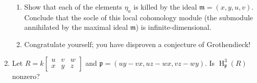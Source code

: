 \documentclass[11pt]{book}
\numberwithin{equation}{section}
\numberwithin{theorem}{chapter}
\theoremstyle{definition}
\newtheorem*{basic properties}{Basic Properties}
\newtheorem*{Important Remark}{Important Remark}
\theoremstyle{remark}
\newcommand{\m}{\mathfrak{m}}
\newcommand{\p}{\mathfrak{p}}
\renewcommand{\H}{\operatorname{H}}
\begin{document}
\begin{enumerate}[1)]
\begin{enumerate}
		
		\item Show that each of the elements $\eta_a$ is killed by the ideal $\m=(x,y,u,v)$. Conclude that the socle of this local cohomology module (the submodule annihilated by the maximal ideal $\m$) is infinite-dimensional.

		
		\item Congratulate yourself; you have disproven a conjecture of Grothendieck!
		
	\end{enumerate}
	

	
	\item Let $R = \displaystyle k\begin{bmatrix} u & v & w \\ x & y & z\end{bmatrix}$ and $\p=(uy-vx,uz-wx,vz-wy)$. Is $\H^3_{\p}(R)$ nonzero?
\end{enumerate}
\end{document}
